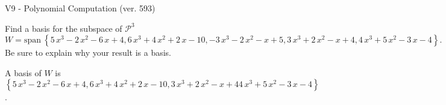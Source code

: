 \begin{exercise}
  \begin{exerciseTitle}V9 - Polynomial Computation (ver. 593)\end{exerciseTitle}
  \begin{exerciseStatement}
    Find a basis for the subspace of \(\mathcal{P}^3\) 
\[W=\mathrm{span}\ \left\{5 \, x^{3} - 2 \, x^{2} - 6 \, x + 4 , 6 \, x^{3} + 4 \, x^{2} + 2 \, x - 10 , -3 \, x^{3} - 2 \, x^{2} - x + 5 , 3 \, x^{3} + 2 \, x^{2} - x + 4 , 4 \, x^{3} + 5 \, x^{2} - 3 \, x - 4\right\}.\]
 Be sure to explain why your result is a basis.


  \end{exerciseStatement}
  \begin{exerciseAnswer}
   A basis of \(W\) is  \(\left\{5 \, x^{3} - 2 \, x^{2} - 6 \, x + 4 , 6 \, x^{3} + 4 \, x^{2} + 2 \, x - 10 , 3 \, x^{3} + 2 \, x^{2} - x + 4 4 \, x^{3} + 5 \, x^{2} - 3 \, x - 4\right\}\).
  


  \end{exerciseAnswer}
\end{exercise}